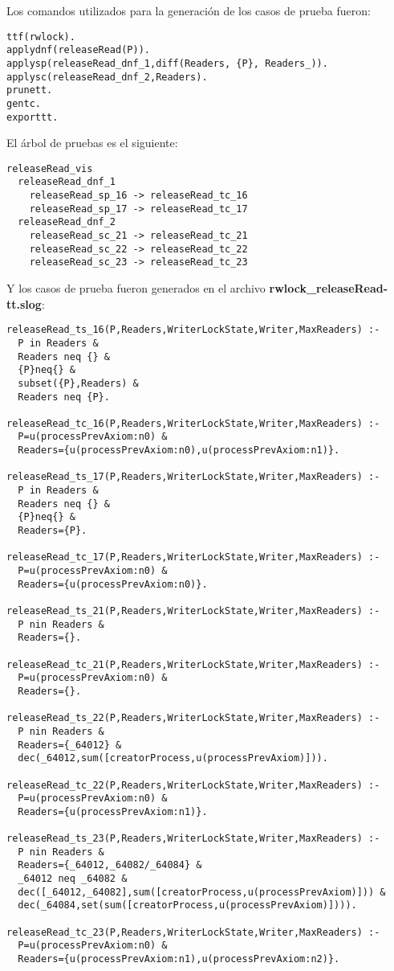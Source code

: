 \documentclass[a4paper, 12pt]{article}
\begin{document}
Los comandos utilizados para la generación de los casos de prueba fueron:
\begin{verbatim}
ttf(rwlock).
applydnf(releaseRead(P)).
applysp(releaseRead_dnf_1,diff(Readers, {P}, Readers_)).
applysc(releaseRead_dnf_2,Readers).
prunett.
gentc.
exporttt.
\end{verbatim}

El árbol de pruebas es el siguiente:
\begin{verbatim}
releaseRead_vis
  releaseRead_dnf_1
    releaseRead_sp_16 -> releaseRead_tc_16
    releaseRead_sp_17 -> releaseRead_tc_17
  releaseRead_dnf_2
    releaseRead_sc_21 -> releaseRead_tc_21
    releaseRead_sc_22 -> releaseRead_tc_22
    releaseRead_sc_23 -> releaseRead_tc_23
\end{verbatim}

Y los casos de prueba fueron generados en el archivo \textbf{rwlock\_releaseRead-tt.slog}:

\begin{verbatim}
releaseRead_ts_16(P,Readers,WriterLockState,Writer,MaxReaders) :-
  P in Readers &
  Readers neq {} &
  {P}neq{} &
  subset({P},Readers) &
  Readers neq {P}.

releaseRead_tc_16(P,Readers,WriterLockState,Writer,MaxReaders) :-
  P=u(processPrevAxiom:n0) &
  Readers={u(processPrevAxiom:n0),u(processPrevAxiom:n1)}.

releaseRead_ts_17(P,Readers,WriterLockState,Writer,MaxReaders) :-
  P in Readers &
  Readers neq {} &
  {P}neq{} &
  Readers={P}.

releaseRead_tc_17(P,Readers,WriterLockState,Writer,MaxReaders) :-
  P=u(processPrevAxiom:n0) &
  Readers={u(processPrevAxiom:n0)}.

releaseRead_ts_21(P,Readers,WriterLockState,Writer,MaxReaders) :-
  P nin Readers &
  Readers={}.

releaseRead_tc_21(P,Readers,WriterLockState,Writer,MaxReaders) :-
  P=u(processPrevAxiom:n0) &
  Readers={}.

releaseRead_ts_22(P,Readers,WriterLockState,Writer,MaxReaders) :-
  P nin Readers &
  Readers={_64012} &
  dec(_64012,sum([creatorProcess,u(processPrevAxiom)])).

releaseRead_tc_22(P,Readers,WriterLockState,Writer,MaxReaders) :-
  P=u(processPrevAxiom:n0) &
  Readers={u(processPrevAxiom:n1)}.

releaseRead_ts_23(P,Readers,WriterLockState,Writer,MaxReaders) :-
  P nin Readers &
  Readers={_64012,_64082/_64084} &
  _64012 neq _64082 &
  dec([_64012,_64082],sum([creatorProcess,u(processPrevAxiom)])) &
  dec(_64084,set(sum([creatorProcess,u(processPrevAxiom)]))).

releaseRead_tc_23(P,Readers,WriterLockState,Writer,MaxReaders) :-
  P=u(processPrevAxiom:n0) &
  Readers={u(processPrevAxiom:n1),u(processPrevAxiom:n2)}.
\end{verbatim}
\end{document}
